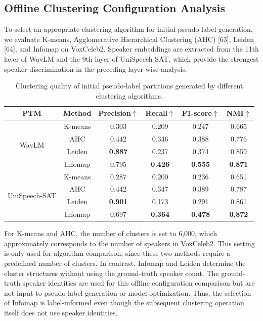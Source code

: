 \documentclass[journal]{IEEEtran}
\begin{document}
\subsection{Offline Clustering Configuration Analysis}
To select an appropriate clustering algorithm for initial pseudo-label
generation, we evaluate K-means, Agglomerative Hierarchical
Clustering (AHC) [63], Leiden [64], and Infomap on
VoxCeleb2.
Speaker embeddings are extracted from the 11th layer of WavLM and the
9th layer of UniSpeech-SAT, which provide the strongest speaker
discrimination in the preceding layer-wise analysis.
\begin{table}[!t] 
    \centering
    \caption{Clustering quality of initial pseudo-label partitions generated by different clustering algorithms.} 
    \setlength{\tabcolsep}{4pt} %
    \begin{tabular}{c c c c c c} %
        \hline
        PTM & Method & Precision$\uparrow$ & Recall$\uparrow$ & F1-score$\uparrow$ & NMI$\uparrow$ \\
        \hline
        \multirow{4}{*}{WavLM}
        & K-means  & 0.303 & 0.209 & 0.247  & 0.665  \\ 
        & AHC  & 0.442 & 0.346 & 0.388  & 0.776  \\
        & Leiden  & \textbf{0.887} & 0.237 & 0.374  & 0.859  \\
        & Infomap & 0.795 & \textbf{0.426} & \textbf{0.555} &\textbf{0.871}  \\
        \hline
        \multirow{4}{*}{UniSpeech-SAT}
        & K-means  & 0.287 & 0.200 & 0.236  & 0.651  \\ 
        & AHC  & 0.442 & 0.347 & 0.389  & 0.787  \\
        & Leiden  & \textbf{0.901} & 0.173 & 0.291  & 0.861  \\
        & Infomap  & 0.697 & \textbf{0.364} & \textbf{0.478}&\textbf{0.872}  \\
        \hline
    \end{tabular}
    \label{tab:clustering}
\end{table}
For K-means and AHC, the number of clusters is set to 6,000, which
approximately corresponds to the number of speakers in VoxCeleb2.
This setting is only used for algorithm comparison, since these two
methods require a predefined number of clusters.
In contrast, Infomap and Leiden determine the cluster structures
without using the ground-truth speaker count.
The ground-truth speaker identities are used for this offline configuration
comparison but are not input to pseudo-label generation or model
optimization. Thus, the selection of Infomap is label-informed even though
the subsequent clustering operation itself does not use speaker identities.
\end{document}
